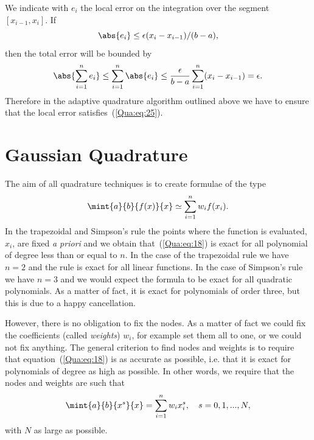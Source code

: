 \smallskip

\noindent
We indicate with $e_i$ the local error on the integration over the
segment $[x_{i-1},x_i]$. If
%
\begin{equation}
  \abs{e_i} \le \epsilon (x_i-x_{i-1})/(b-a),
  \label{Qua:eq:25}
\end{equation}
%
then the total error will be bounded by
%
\begin{equation}
  \abs{ \sum_{i=1}^n e_i} \le \sum_{i=1}^n \abs{e_i} \le
  \frac{\epsilon}{b-a} \sum_{i=1}^n (x_i-x_{i-1}) = \epsilon.
  \label{Qua:eq:26}
\end{equation}
%
Therefore in the adaptive quadrature algorithm outlined above we have
to ensure that the local error satisfies~(\ref{Qua:eq:25}).

\section{Gaussian Quadrature}

The aim of all quadrature techniques is to create formulae of the type
%
\begin{equation}
  \mint{a}{b}{f(x)}{x} \simeq \sum_{i=1}^n w_i f(x_i) .
 \label{Qua:eq:18}
\end{equation}
%
In the trapezoidal and Simpson's rule the points where the function is
evaluated, $x_i$, are fixed \textit{a priori} and we obtain
that~(\ref{Qua:eq:18}) is exact for all polynomial of degree less than
or equal to $n$.  In the case of the trapezoidal rule we have $n=2$
and the rule is exact for all linear functions.  In the case of
Simpson's rule we have $n=3$ and we would expect the formula to be
exact for all quadratic polynomials.  As a matter of fact, it is exact
for polynomials of order three, but this is due to a happy
cancellation.

However, there is no obligation to fix the nodes.  As a matter of fact
we could fix the coefficients (called \textit{weights}) $w_i$, for
example set them all to one, or we could not fix anything.  The
general criterion to find nodes and weights is to require that
equation~(\ref{Qua:eq:18}) is as accurate as possible, i.e. that it is
exact for polynomials of degree as high as possible.  In other words,
we require that the nodes and weights are such that
%
\begin{equation}
  \mint{a}{b}{x^s}{x} = \sum_{i=1}^n w_i x_i^s, \quad s=0,1,...,N,
  \label{Qua:eq:27}
\end{equation}
%
with $N$ as large as possible.

